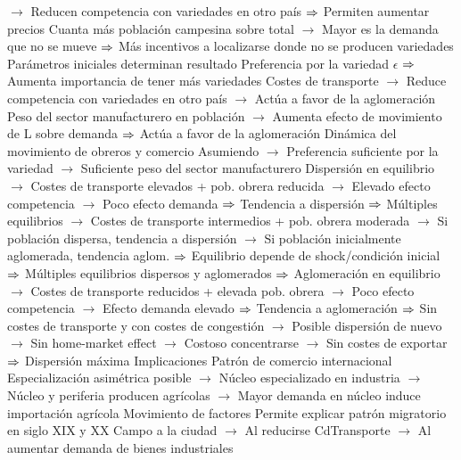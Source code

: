 \documentclass{nuevotema}
\begin{document}
\begin{esquemal}
				\4[] $\to$ Reducen competencia con variedades en otro país
				\4[] $\Rightarrow$ Permiten aumentar precios
				\4[] Cuanta más población campesina sobre total
				\4[] $\to$ Mayor es la demanda que no se mueve
				\4[] $\Rightarrow$ Más incentivos a localizarse donde no se producen variedades
				\4 Parámetros iniciales determinan resultado
				\4[] Preferencia por la variedad $\epsilon$
				\4[] $\Rightarrow$ Aumenta importancia de tener más variedades
				\4[] Costes de transporte
				\4[] $\to$ Reduce competencia con variedades en otro país
				\4[] $\to$ Actúa a favor de la aglomeración
				\4[] Peso del sector manufacturero en población
				\4[] $\to$ Aumenta efecto de movimiento de L sobre demanda
				\4[] $\Rightarrow$ Actúa a favor de la aglomeración
				\4 Dinámica del movimiento de obreros y comercio
				\4[] Asumiendo
				\4[] $\to$ Preferencia suficiente por la variedad
				\4[] $\to$ Suficiente peso del sector manufacturero
				\4[] Dispersión en equilibrio
				\4[] $\to$ Costes de transporte elevados +  pob. obrera reducida
				\4[] $\to$ Elevado efecto competencia
				\4[] $\to$ Poco efecto demanda
				\4[] $\Rightarrow$ Tendencia a dispersión
				\4[] $\Rightarrow$ 
				\4[] Múltiples equilibrios
				\4[] $\to$ Costes de transporte intermedios + pob. obrera moderada
				\4[] $\to$ Si población dispersa, tendencia a dispersión
				\4[] $\to$ Si población inicialmente aglomerada, tendencia aglom.
				\4[] $\Rightarrow$ Equilibrio depende de shock/condición inicial
				\4[] $\Rightarrow$ Múltiples equilibrios dispersos y aglomerados
				\4[] $\Rightarrow$ 
				\4[] Aglomeración en equilibrio
				\4[] $\to$ Costes de transporte reducidos + elevada pob. obrera
				\4[] $\to$ Poco efecto competencia
				\4[] $\to$ Efecto demanda elevado
				\4[] $\Rightarrow$ Tendencia a aglomeración
				\4[] $\Rightarrow$ 
				\4[] Sin costes de transporte y con costes de congestión
				\4[] $\to$ Posible dispersión de nuevo
				\4[] $\to$ Sin home-market effect
				\4[] $\to$ Costoso concentrarse
				\4[] $\to$ Sin costes de exportar
				\4[] $\Rightarrow$ Dispersión máxima
			\3 Implicaciones
				\4 Patrón de comercio internacional
				\4[] Especialización asimétrica posible
				\4[] $\to$ Núcleo especializado en industria
				\4[] $\to$ Núcleo y periferia producen agrícolas
				\4[] $\to$ Mayor demanda en núcleo induce importación agrícola
				\4 Movimiento de factores
				\4[] Permite explicar patrón migratorio en siglo XIX y XX
				\4[] Campo a la ciudad
				\4[] $\to$ Al reducirse CdTransporte
				\4[] $\to$ Al aumentar demanda de bienes industriales

\end{esquemal}
\end{document}

